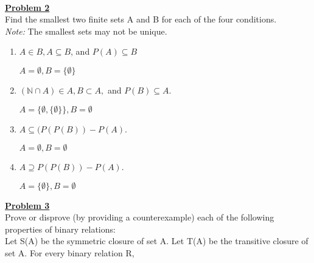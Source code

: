 \documentclass[11pt]{article}
\begin{document}
\ \\\\\\\\\\\\\\\\\\\\\\
	\noindent\textbf{\underline{Problem 2}}\\
	Find the smallest two finite sets A and B for each of the four conditions.\\
\textit{Note:} The smallest sets may not be unique.

	\begin{enumerate}
		\item $A \in B, A \subseteq B$, and $P(A) \subseteq B$

			$A = \emptyset , B = \{ \emptyset \}$\\
		\item $( \mathbb{N} \cap A ) \in A, B \subset A,$ and $P(B) \subseteq A.$

			$A = \{ \emptyset, \{ \emptyset \} \} , B = \emptyset$\\
		\item $A \subseteq (P (P(B)) - P(A)$.

			$A = \emptyset, B = \emptyset$\\
		\item $A \supseteq P (P(B)) - P(A)$.

			$A = \{ \emptyset \} , B = \emptyset$
	
	\end{enumerate}

	\noindent\textbf{\underline{Problem 3}}\\
	Prove or disprove (by providing a counterexample) each of the following properties of binary relations:\\
	Let S(A) be the symmetric closure of set A. Let T(A) be the transitive closure of set A. For every binary relation R, 
\end{document}

